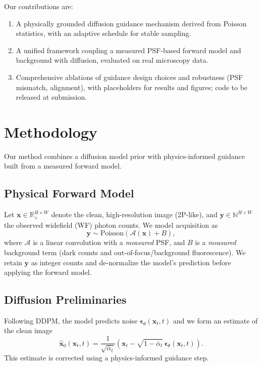\documentclass{article}
\newcommand{\wf}{WF\xspace}
\newcommand{\twop}{2P\xspace}
\begin{document}
Our contributions are:
\begin{enumerate}
    \item A physically grounded diffusion guidance mechanism derived from Poisson statistics, with an adaptive schedule for stable sampling.
    \item A unified framework coupling a measured PSF-based forward model and background with diffusion, evaluated on real microscopy data.
    \item Comprehensive ablations of guidance design choices and robustness (PSF mismatch, alignment), with placeholders for results and figures; code to be released at submission.
\end{enumerate}

\section{Methodology}
\label{sec:methodology}
Our method combines a diffusion model prior with physics-informed guidance built from a measured forward model.

\subsection{Physical Forward Model}
Let $\mathbf{x} \in \mathbb{R}_+^{H\times W}$ denote the clean, high-resolution image (\twop-like), and $\mathbf{y} \in \mathbb{N}^{H\times W}$ the observed widefield (\wf) photon counts. We model acquisition as
\begin{equation}
\mathbf{y} \sim \mathrm{Poisson}(\mathcal{A}(\mathbf{x}) + B),
\end{equation}
where $\mathcal{A}$ is a linear convolution with a \emph{measured} PSF, and $B$ is a \emph{measured} background term (dark counts and out-of-focus/background fluorescence). We retain $\mathbf{y}$ as integer counts and de-normalize the model's prediction before applying the forward model.

\subsection{Diffusion Preliminaries}
Following DDPM, the model predicts noise $\boldsymbol{\epsilon}_\theta(\mathbf{x}_t, t)$ and we form an estimate of the clean image
\begin{equation}
\hat{\mathbf{x}}_0(\mathbf{x}_t,t) = \frac{1}{\sqrt{\bar{\alpha}_t}}\left(\mathbf{x}_t - \sqrt{1-\bar{\alpha}_t}\,\boldsymbol{\epsilon}_\theta(\mathbf{x}_t, t)\right).
\end{equation}
This estimate is corrected using a physics-informed guidance step.
\end{document}
